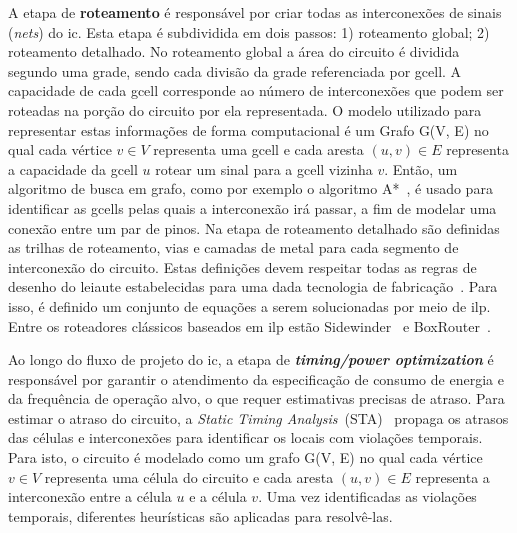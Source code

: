 A etapa de \textbf{roteamento} é responsável por criar todas as interconexões de sinais (\textit{nets}) do \ac{ic}.
Esta etapa é subdividida em dois passos: 1) roteamento global; 2) roteamento detalhado.
No roteamento global a área do circuito é dividida segundo uma grade, sendo cada divisão da grade referenciada por gcell.
A capacidade de cada gcell corresponde ao número de interconexões que podem ser roteadas na porção do circuito por ela representada.
O modelo utilizado para representar estas informações de forma computacional é um Grafo G(V, E) no qual cada vértice $v \in V$ representa uma gcell e cada aresta $(u, v) \in E$ representa a capacidade da gcell $u$ rotear um sinal para a gcell vizinha $v$.
Então, um algoritmo de busca em grafo, como por exemplo o algoritmo A*~\cite{russell2009artificial}, é usado para identificar as gcells pelas quais a interconexão irá passar, a fim de modelar uma conexão entre um par de pinos.
Na etapa de roteamento detalhado são definidas as trilhas de roteamento, vias e camadas de metal para cada segmento de interconexão do circuito.
Estas definições devem respeitar todas as regras de desenho do leiaute estabelecidas para uma dada tecnologia de fabricação~\cite{kahng2011vlsi}.
Para isso, é definido um conjunto de equações a serem solucionadas por meio de \ac{ilp}.
Entre os roteadores clássicos baseados em \ac{ilp} estão Sidewinder~\cite{hu2008sidewinder} e BoxRouter~\cite{cho2007boxrouter}.


Ao longo do fluxo de projeto do \ac{ic}, a etapa de \textbf{\textit{timing/power optimization}} é responsável por garantir o atendimento da especificação de consumo de energia e da frequência de operação alvo, o que requer estimativas precisas de atraso. 
Para estimar o atraso do circuito, a \textit{Static Timing Analysis}~(STA)~\cite{srivastava2006statistical, chadha2009static} propaga os atrasos das células e interconexões para identificar os locais com violações temporais.
Para isto, o circuito é modelado como um grafo G(V, E) no qual cada vértice $v \in V$ representa uma célula do circuito e cada aresta $(u, v) \in E$ representa a interconexão entre a célula $u$ e a célula $v$. 
Uma vez identificadas as violações temporais, diferentes heurísticas são aplicadas para resolvê-las.

